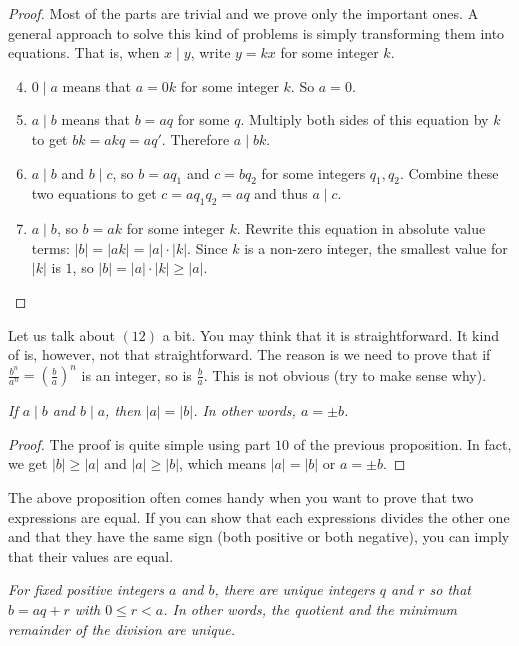 \documentclass{subfile}
\begin{document}
	\begin{proof}
		Most of the parts are trivial and we prove only the important ones. A general approach to solve this kind of problems is simply transforming them into equations. That is, when $x\mid y$, write $y=kx$ for some integer $k$.
		\begin{enumerate}
			\setcounter{enumi}{3}
			\item $0\mid a$ means that $a=0k$ for some integer $k$. So $a=0$.
			\setcounter{enumi}{5}
			\item $a\mid b$ means that $b=aq$ for some $q$. Multiply both sides of this equation by $k$ to get $bk = akq=aq'$. Therefore $a\mid bk$.
			\setcounter{enumi}{8}
			\item $a\mid b$ and $b\mid c$, so $b=aq_1$ and $c=bq_2$ for some integers $q_1, q_2$. Combine these two equations to get $c = aq_1q_2 = aq$ and thus $a\mid c$.
			\setcounter{enumi}{9}
			\item $a\mid b$, so $b = ak$ for some integer $k$. Rewrite this equation in absolute value terms: $|b| = |ak| = |a| \cdot |k|$. Since $k$ is a non-zero integer, the smallest value for $|k|$ is $1$, so $|b| = |a| \cdot |k| \geq |a|$.
			\setcounter{enumi}{11}
		\end{enumerate}
	\end{proof}
	Let us talk about $(12)$ a bit. You may think that it is straightforward. It kind of is, however, not that straightforward. The reason is we need to prove that if $\frac{b^n}{a^n}=\left(\frac{b}{a}\right)^n$ is an integer, so is $\frac{b}{a}$. This is not obvious (try to make sense why).

	\begin{proposition}\slshape\label{prop:bothdivide}
		If $a \mid b$ and $b \mid a$, then  $|a|=|b|$. In other words, $a=\pm b$.
	\end{proposition}

	\begin{proof}
		The proof is quite simple using part $10$ of the previous proposition. In fact, we get $|b| \geq |a|$ and $|a| \geq |b|$, which means $|a| = |b|$ or $a = \pm b$.
	\end{proof}
	The above proposition often comes handy when you want to prove that two expressions are equal. If you can show that each expressions divides the other one and that they have the same sign (both positive or both negative), you can imply that their values are equal.

	\begin{proposition}\slshape
		For fixed positive integers $a$ and $b$, there are unique integers $q$ and $r$ so that $b=aq+r$ with $0\leq r<a$. In other words, the quotient and the minimum remainder of the division are unique.
	\end{proposition}
\end{document}
